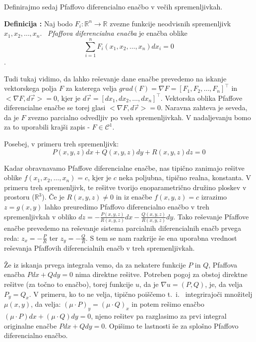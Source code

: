 \documentclass[a4paper, 10pt]{article}
\newcounter{defcount}
\newenvironment{definicija}{\begin{flushleft}\refstepcounter{defcount}\textbf{Definicija \arabic{defcount}:}}{\hfill\end{flushleft}}
\newcommand{\mth}[1]{\ensuremath{\mathbb{#1}}}
\newcommand{\R}{\mth{R}}
\newcommand{\pojem}[1]{\emph{#1}}
\newcommand{\map}[3]{\ensuremath{{#1}: {#2} \rightarrow {#3}}}
\begin{document}
			Definirajmo sedaj Pfaffovo diferencialno enačbo v večih spremenljivkah.
			
			\begin{definicija}
				\label{def:PfaffDE}
				Naj bodo $\map{F_i}{\R^n}{\R}$ zvezne funkcije neodvisnih spremenljivk $x_1, x_2, \ldots, x_n$. ~\pojem{Pfaffova diferencialna enačba} je enačba oblike $$\sum_{i = 1}^{n}F_i(x_1, x_2, \ldots, x_n) dx_i = 0$$.
			\end{definicija}
			
			Tudi tukaj vidimo, da lahko reševanje dane enačbe prevedemo na iskanje vektorskega polja $F$ za katerega velja $grad(F) = \nabla F = [F_1, F_2, \ldots, F_n]^\top$ in $<\nabla F , d\vec{r}> = 0$, kjer je $d\vec{r} = [dx_1, dx_2, \ldots, dx_n]^\top$. Vektorska oblika Pfaffove diferencialne enačbe se torej glasi $<\nabla F, d\vec{r}> = 0$. Naravna zahteva je seveda, da je $F$ zvezno parcialno odvedljiv po vseh spremenljivkah. V nadaljevanju bomo za to uporabili krajši zapis - $F\in \mathcal{C}^1$.
			
			Posebej, v primeru treh spremenljivk: $$P(x, y, z)dx + Q(x, y, z)dy + R(x, y, z)dz = 0$$
			
			Kadar obravnavamo Pfaffove diferencialne enačbe, nas tipično zanimajo rešitve oblike $f(x_1, x_2, \ldots, x_n) = c$, kjer je $c$ neka poljubna, tipično realna, konstanta. V primeru treh spremenljivk, te rešitve tvorijo enoparametrično družino ploskev v prostoru ($\R^3$). Če je $R(x, y, z)\neq 0$ in iz enačbe $f(x, y, z) = c$ izrazimo $z = g(x, y)$ lahko preuredimo Pfaffovo diferencialno enačbo v treh spremenljivkah v obliko $dz = -\frac{P(x, y, z)}{R(x, y, z)}dx - \frac{Q(x, y, z)}{R(x, y, z)}dy$. Tako reševanje Pfaffove enačbe prevedemo na reševanje sistema parcialnih diferencialnih enačb prvega reda: $z_x = -\frac{P}{R}$ ter $z_y = -\frac{Q}{R}$. S tem se nam razkrije še ena uporabna vrednost reševanja Pfaffovih diferencialnih enačb v treh spremenljivkah.
			
			Že iz iskanja prvega integrala vemo, da za nekatere funkcije $P$ in $Q$, Pfaffova enačba $Pdx + Qdy = 0$ nima direktne rešitve. Potreben pogoj za obstoj direktne rešitve (za točno to enačbo), torej funkcije $u$, da je $\nabla u = (P, Q)$, je, da velja $P_y = Q_x$. V primeru, ko to ne velja, tipično poiščemo t.~i.~ integrirajoči množitelj $\mu(x, y)$, da velja: $(\mu\cdot P)_y = (\mu\cdot Q)_x$ in potem rešimo enačbo $(\mu\cdot P)dx + (\mu\cdot Q)dy = 0$, njeno rešitev pa razglasimo za prvi integral originalne enačbe $Pdx + Qdy = 0$. Opišimo te lastnosti še za splošno Pfaffovo diferencialno enačbo.
			
\end{document}
